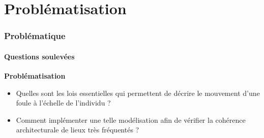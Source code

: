 \section{Problématisation}

\begin{frame}
    \frametitle{Problématique}
    \framesubtitle{Questions soulevées}

    \textbf{Problématisation}

    \begin{itemize}
        \item <2-> Quelles sont les lois essentielles qui permettent de décrire le mouvement d'une foule à l'échelle de l'individu ?
              \bigskip
        \item <3-> Comment implémenter une telle modélisation afin de vérifier la cohérence architecturale de lieux très fréquentés ?

    \end{itemize}
\end{frame}
